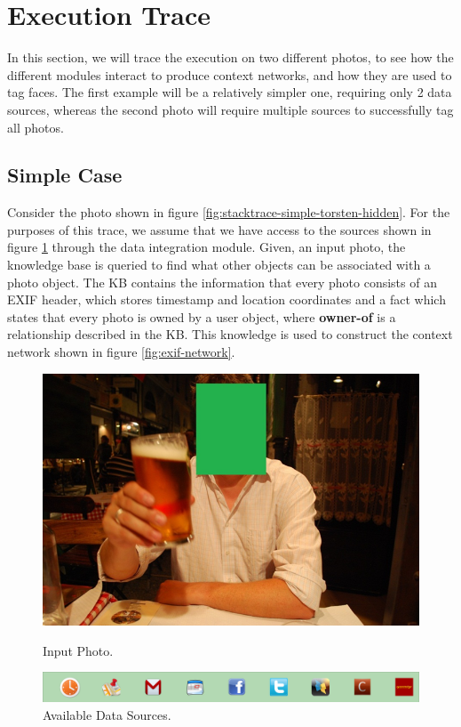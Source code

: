 \section{Execution Trace}
In this section, we will trace the execution on two different photos, to see how the different modules interact to produce context networks, and how they are used to tag faces. The first example will be a relatively simpler one, requiring only 2 data sources, whereas the second photo will require multiple sources to successfully tag all photos.

\subsection{Simple Case}

Consider the photo shown in figure \ref{fig:stacktrace-simple-torsten-hidden}. For the purposes of this trace, we assume that we have access to the sources shown in figure \ref{fig:stacktrace-simple-sources} through the data integration module. Given, an input photo, the knowledge base is queried to find what other objects can be associated with a photo object. The KB contains the information that every photo consists of an EXIF header, which stores timestamp and location coordinates and a fact which states that every photo is owned by a user object, where \textbf{owner-of} is a relationship described in the KB. This knowledge is used to construct the context network shown in figure \ref{fig:exif-network}.

\begin{figure}[ht]
\begin{minipage}[b]{0.45\linewidth}
\centering
\includegraphics[width=\textwidth]{media/chapter4/stacktrace/torsten-hidden.png}
\caption{Input Photo.}
\label{fig:stacktrace-simple-torsten-hidden}
\end{minipage}
\hspace{0.5cm}
\begin{minipage}[b]{0.45\linewidth}
\centering
\includegraphics[width=\textwidth]{media/chapter4/stacktrace/sources.png}
\caption{Available Data Sources.}
\label{fig:stacktrace-simple-sources}
\end{minipage}
\end{figure}

